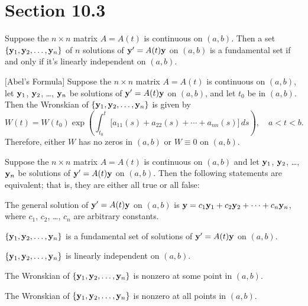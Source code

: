 \section*{Section 10.3}
\setcounter{chapter}{10}
\setcounter{section}{3}

\setcounter{theorem}{0}
\begin{theorem}
  \label{thmtype:10.3.1} Suppose the $n\times n$ matrix $A=A(t)$ is continuous on $(a,b)$. Then a
  set $\{{\bf y}_{1},{\bf y}_{2},\dots,{\bf y}_{n}\}$ of $n$ solutions of ${\bf y}'=A(t){\bf y}$ on
  $(a,b)$ is a fundamental set if and only if it's linearly independent on $(a,b)$.
\end{theorem}

\setcounter{theorem}{1}
\setcounter{equation}{5}
\begin{theorem}
  $[$Abel's Formula$]$ \label{thmtype:10.3.2} Suppose the $n\times n$ matrix $A=A(t)$ is continuous
  on $(a,b)$, let ${\bf y}_{1}$, ${\bf y}_{2}$, \dots, ${\bf y}_{n}$ be solutions of
  ${\bf y}'=A(t){\bf y}$ on $(a,b)$, and let $t_{0}$ be in $(a,b)$. Then the Wronskian of
  $\{{\bf y}_{1},{\bf y}_{2},\dots,{\bf y}_{n}\}$ is given by
  \begin{equation}
    \label{eq:10.3.6}W(t)=W(t_{0})\exp\left( \int^{t}_{t_{0}}\big[a_{11}(s)+a_{22}(s)+\cdots+a_{nn}(s)]\, ds\right),\quad a<t<b.
  \end{equation}
  Therefore, either $W$ has no zeros in $(a,b)$ or $W\equiv0$ on $(a,b)$.
\end{theorem}

\setcounter{theorem}{2}
\begin{theorem}
  \label{thmtype:10.3.3} Suppose the $n\times n$ matrix $A=A(t)$ is continuous on $(a,b)$ and let
  ${\bf y}_{1}$, ${\bf y}_{2}$, \dots,${\bf y}_{n}$ be solutions of ${\bf y}'=A(t){\bf y}$ on
  $(a,b)$. Then the following statements are equivalent; that is, they are either all true or all
  false:
  \begin{alist}
    \item %
    The general solution of ${\bf y}'=A(t){\bf y}$ on $(a,b)$ is
    ${\bf y}=c_{1}{\bf y}_{1}+c_{2}{\bf y}_{2}+\cdots+c_{n}{\bf y}_{n}$, where $c_{1}$, $c_{2}$,
    \dots, $c_{n}$ are arbitrary constants.

    \item %
    $\{{\bf y}_{1},{\bf y}_{2},\dots,{\bf y}_{n}\}$ is a fundamental set of solutions of
    ${\bf y}'=A(t){\bf y}$ on $(a,b)$.

    \item %
    $\{{\bf y}_{1},{\bf y}_{2},\dots,{\bf y}_{n}\}$ is linearly independent on $(a,b)$.

    \item %
    The Wronskian of $\{{\bf y}_{1},{\bf y}_{2},\dots,{\bf y}_{n}\}$ is nonzero at some point in
    $(a,b)$.

    \item %
    The Wronskian of $\{{\bf y}_{1},{\bf y}_{2},\dots,{\bf y}_{n}\}$ is nonzero at all points in
    $(a,b)$.
  \end{alist}
\end{theorem}

